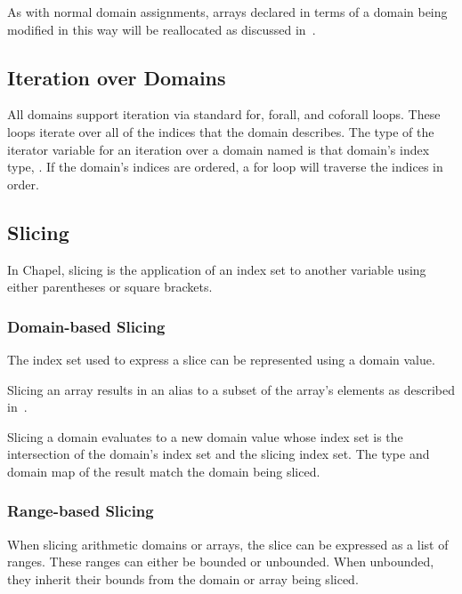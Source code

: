 As with normal domain assignments, arrays declared in terms of a
domain being modified in this way will be reallocated as discussed
in~.



\subsection{Iteration over Domains}
\label{Iteration_over_Domains}

All domains support iteration via standard for, forall, and coforall
loops.  These loops iterate over all of the indices that the domain
describes.  The type of the iterator variable for an iteration over a
domain named  is that domain's index type, .
If the domain's indices are ordered, a for loop will traverse the
indices in order.


\subsection{Slicing}
\label{Slicing}

In Chapel, slicing is the application of an index set to another
variable using either parentheses or square brackets.


\subsubsection{Domain-based Slicing}

The index set used to express a slice can be represented using a
domain value.

Slicing an array results in an alias to a subset of the array's
elements as described in~.

Slicing a domain evaluates to a new domain value whose index set is
the intersection of the domain's index set and the slicing index set.
The type and domain map of the result match the domain being sliced.

%
%

\subsubsection{Range-based Slicing}
\label{Range_Based_Slicing}
When slicing arithmetic domains or arrays, the slice can be expressed
as a list of  ranges.  These ranges can either be bounded
or unbounded.  When unbounded, they inherit their bounds from the
domain or array being sliced.

